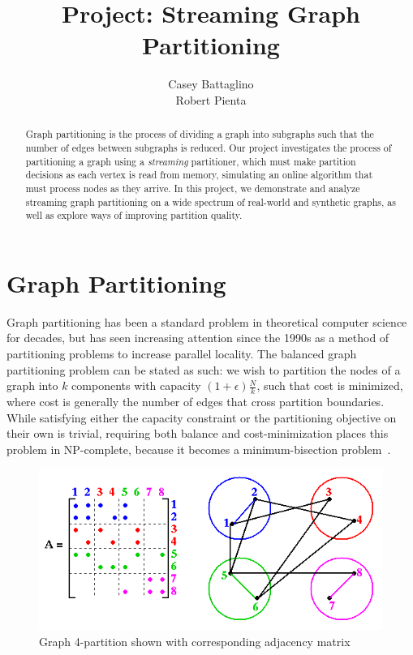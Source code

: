 \documentclass[11pt]{article}
\title{Project: Streaming Graph Partitioning}
\author{Casey Battaglino\\Robert Pienta}
\begin{document}
\maketitle

\begin{abstract}
Graph partitioning is the process of dividing a graph into subgraphs such that the number of edges between subgraphs is reduced. Our project investigates the process of partitioning a graph using a \emph{streaming} partitioner, which must make partition decisions as each vertex is read from memory, simulating an online algorithm that must process nodes as they arrive. In this project, we demonstrate and analyze streaming graph partitioning on a wide spectrum of real-world and synthetic graphs, as well as explore ways of improving partition quality. 
\end{abstract}

\section{Graph Partitioning} \vspace{-10 pt}
Graph partitioning has been a standard problem in theoretical computer science for decades, but has seen increasing attention since the 1990s as a method of partitioning problems to increase parallel locality. The balanced graph partitioning problem can be stated as such: we wish to partition the nodes of a graph into $k$ components with capacity $(1+\epsilon)\frac{N}{k}$, such that cost is minimized, where cost is generally the number of edges that cross partition boundaries. While satisfying either the capacity constraint or the partitioning objective on their own is trivial, requiring both balance and cost-minimization places this problem in NP-complete, because it becomes a minimum-bisection problem~\cite{Garey:1979:CIG:578533}.

\begin{figure}[h]
\centering
\includegraphics[scale=.60] {figures/graphpart.png}
\caption[Caption for]{Graph 4-partition shown with corresponding adjacency matrix \footnotemark}
\label{fig:0}
\end{figure}
\end{document}
